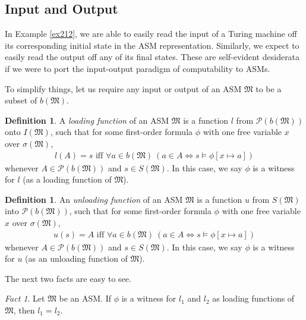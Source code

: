 \documentclass[12pt, twoside]{memoir}
\numberwithin{equation}{section}
\theoremstyle{definition}
\newtheorem{defi}[thm]{Definition}
\theoremstyle{remark}
\newtheorem{fact}[thm]{Fact}
\theoremstyle{definition}
\theoremstyle{definition}
\theoremstyle{definition}
\theoremstyle{remark}
\begin{document}
\subsection{Input and Output}

In Example \ref{ex212}, we are able to easily read the input of a Turing machine off its corresponding initial state in the ASM representation. Similarly, we expect to easily read the output off any of its final states. These are self-evident desiderata if we were to port the input-output paradigm of computability to ASMs. 

To simplify things, let us require any input or output of an ASM $\mathfrak{M}$ to be a subset of $b(\mathfrak{M})$.

\begin{defi}
A \emph{loading function} of an ASM $\mathfrak{M}$ is a function $l$ from $\mathcal{P}(b(\mathfrak{M}))$ onto $I(\mathfrak{M})$, such that for some first-order formula $\phi$ with one free variable $x$ over $\sigma(\mathfrak{M})$,
\begin{align*}
    l(A) = s \text{ iff } \forall a \in b(\mathfrak{M}) \ (a \in A \iff s \models \phi[x \mapsto a])
\end{align*}
whenever $A \in \mathcal{P}(b(\mathfrak{M}))$ and $s \in S(\mathfrak{M})$. In this case, we say $\phi$ is a witness for $l$ (as a loading function of $\mathfrak{M}$).
\end{defi}

\begin{defi}
An \emph{unloading function} of an ASM $\mathfrak{M}$ is a function $u$ from $S(\mathfrak{M})$ into $\mathcal{P}(b(\mathfrak{M}))$, such that for some first-order formula $\phi$ with one free variable $x$ over $\sigma(\mathfrak{M})$,
\begin{align*}
    u(s) = A \text{ iff } \forall a \in b(\mathfrak{M}) \ (a \in A \iff s \models \phi[x \mapsto a])
\end{align*}
whenever $A \in \mathcal{P}(b(\mathfrak{M}))$ and $s \in S(\mathfrak{M})$. In this case, we say $\phi$ is a witness for $u$ (as an unloading function of $\mathfrak{M}$).
\end{defi}

The next two facts are easy to see.

\begin{fact}\label{fact215}
Let $\mathfrak{M}$ be an ASM. If $\phi$ is a witness for $l_1$ and $l_2$ as loading functions of $\mathfrak{M}$, then $l_1 = l_2$.
\end{fact}
\end{document}
